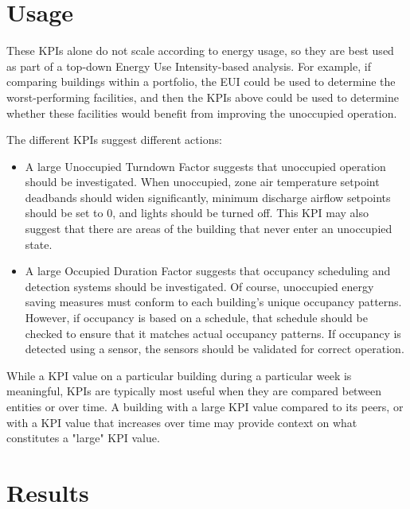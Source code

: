 \documentclass[a4paper]{article}
\begin{document}
\section{Usage}

These KPIs alone do not scale according to energy usage, so they are best used as part of a top-down Energy Use Intensity-based analysis. For example, if comparing buildings within a portfolio, the EUI could be used to determine the worst-performing facilities, and then the KPIs above could be used to determine whether these facilities would benefit from improving the unoccupied operation.

The different KPIs suggest different actions:
\begin{itemize}
\item{A large Unoccupied Turndown Factor suggests that unoccupied operation should be investigated. When unoccupied, zone air temperature setpoint deadbands should widen significantly, minimum discharge airflow setpoints should be set to 0, and lights should be turned off. This KPI may also suggest that there are areas of the building that never enter an unoccupied state.}
\item{A large Occupied Duration Factor suggests that occupancy scheduling and detection systems should be investigated. Of course, unoccupied energy saving measures must conform to each building's unique occupancy patterns. However, if occupancy is based on a schedule, that schedule should be checked to ensure that it matches actual occupancy patterns. If occupancy is detected using a sensor, the sensors should be validated for correct operation.}
\end{itemize}

While a KPI value on a particular building during a particular week is meaningful, KPIs are typically most useful when they are compared between entities or over time. A building with a large KPI value compared to its peers, or with a KPI value that increases over time may provide context on what constitutes a "large" KPI value.

\section{Results}
\end{document}
